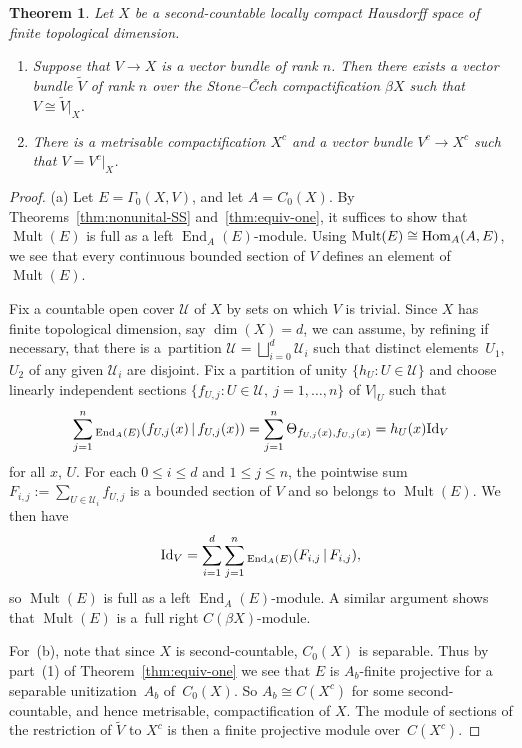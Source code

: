 \documentclass[pdftex]{sigma}
\numberwithin{equation}{section}
\newtheorem{thm}{Theorem}[section]
\DeclareMathOperator{\End}{End} %
\DeclareMathOperator{\Mult}{Mult} %
\begin{document}
\begin{thm}
\label{cor:VB}
Let $X$ be a second-countable locally compact Hausdorff space of finite topological dimension.
\begin{enumerate}\itemsep=0pt
\item[$a)$]\label{it:bundle extension} Suppose that $V\to X$ is a vector bundle of rank $n$. Then there exists a vector bundle $\tilde{V}$ of rank $n$ over the Stone--\v{C}ech compactification $\beta X$ such that $V \cong \tilde{V}|_X$.
\item[$b)$] There is a metrisable compactification $X^c$ and a vector bundle $V^c\to X^c$ such that $V=V^c|_X$.
\end{enumerate}
\end{thm}
\begin{proof}
(a) Let $E=\Gamma_0(X,V)$, and let $A = C_0(X)$. By Theorems~\ref{thm:nonunital-SS} and~\ref{thm:equiv-one}, it suf\/f\/ices to show that $\Mult(E)$ is full as a left $\End_A(E)$-module. Using $\Mult(E)\cong {\rm Hom}_A(A,E)$, we see that every continuous bounded section of $V$ def\/ines an element of $\Mult(E)$.

Fix a countable open cover $\mathcal{U}$ of $X$ by sets on which $V$ is trivial. Since $X$ has f\/inite topological dimension, say $\dim(X) = d$, we can assume, by ref\/ining if necessary, that there is a~partition $\mathcal{U} = \bigsqcup\limits^d_{i=0} \mathcal{U}_i$ such that distinct elements~$U_1$,~$U_2$ of any given $\mathcal{U}_i$ are disjoint. Fix a partition of unity $\{h_U \colon U\in \mathcal{U}\}$ and choose linearly independent sections $\{f_{U,j} \colon U \in \mathcal{U},\ j=1,\dots,n\}$ of $V|_U$ such that
\begin{gather*}
\sum_{j=1}^n{}_{\End_A(E)}(f_{U,j}(x) \,|\, f_{U,j}(x)) =\sum_{j=1}^n\Theta_{f_{U,j}(x) , f_{U,j}(x)} = h_U(x){\rm Id}_V
\end{gather*}
for all $x$, $U$. For each $0 \le i \le d$ and $1\leq j\leq n$, the pointwise sum $F_{i,j} := \sum\limits_{U \in \mathcal{U}_i}
f_{U,j}$ is a bounded section of $V$ and so belongs to $\Mult(E)$. We then have
\begin{gather*}
{\rm Id}_V = \sum^d_{i=1}\sum_{j=1}^n {}_{\End_A(E)}(F_{i,j} \,|\, F_{i,j}),
\end{gather*}
so $\Mult(E)$ is full as a left $\End_A(E)$-module. A similar argument shows that $\Mult(E)$ is a~full right $C(\beta X)$-module.

For~(b), note that since $X$ is second-countable, $C_0(X)$ is separable. Thus by part~(1) of Theorem~\ref{thm:equiv-one} we see that $E$ is $A_b$-f\/inite projective for a separable unitization~$A_b$ of~$C_0(X)$. So $A_b \cong C(X^c)$ for some second-countable, and hence metrisable, compactif\/ication of $X$. The module of sections of the restriction of $\tilde{V}$ to $X^c$ is then a f\/inite projective module over~$C(X^c)$.
\end{proof}
\end{document}
